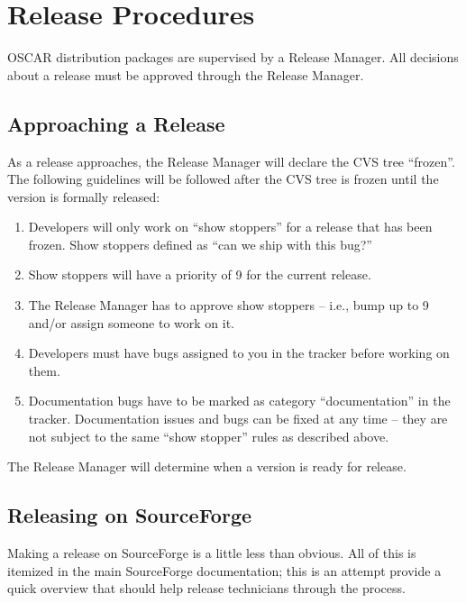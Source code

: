 %
%
%

\section{Release Procedures}
\label{sec:release}

OSCAR distribution packages are supervised by a Release Manager.  All
decisions about a release must be approved through the Release
Manager.

\subsection{Approaching a Release}

As a release approaches, the Release Manager will declare the CVS tree
``frozen''.  The following guidelines will be followed after the CVS
tree is frozen until the version is formally released:

\begin{enumerate}
\item Developers will only work on ``show stoppers'' for a release
  that has been frozen.  Show stoppers defined as ``can we ship with
  this bug?''
  
\item Show stoppers will have a priority of 9 for the current release.
  
\item The Release Manager has to approve show stoppers -- i.e., bump
  up to 9 and/or assign someone to work on it.
  
\item Developers must have bugs assigned to you in the tracker before
  working on them.
  
\item Documentation bugs have to be marked as category
  ``documentation'' in the tracker.  Documentation issues and bugs can
  be fixed at any time -- they are not subject to the same ``show
  stopper'' rules as described above.
\end{enumerate}

The Release Manager will determine when a version is ready for
release.

\subsection{Releasing on SourceForge}

Making a release on SourceForge is a little less than obvious.  All of
this is itemized in the main SourceForge documentation; this is an
attempt provide a quick overview that should help release technicians
through the process.

